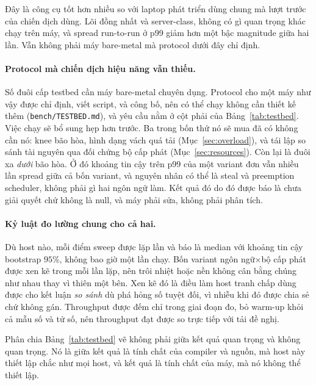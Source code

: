 Đây là công cụ tốt hơn nhiều so với laptop phát triển dùng chung mà lượt trước của
chiến dịch dùng. Lõi đồng nhất và server-class, không có gì quan trọng khác
chạy trên máy, và spread run-to-run ở p99 giảm hơn một bậc
magnitude giữa hai lần. Vẫn không phải máy bare-metal mà protocol dưới đây chỉ định.

\paragraph{Protocol mà chiến dịch hiệu năng vẫn thiếu.}
Số đuôi cấp testbed cần máy bare-metal chuyên dụng. Protocol cho một máy như vậy
được chỉ định, viết script, và công bố, nên có thể chạy không cần thiết kế thêm
(\texttt{bench/TESTBED.md}), và yêu cầu nằm ở cột phải của
Bảng~\ref{tab:testbed}. Việc chạy sẽ bổ sung hẹp hơn trước. Ba trong bốn
thứ nó sẽ mua đã có không cần nó: knee bão hòa, hình dạng
vách quá tải
(Mục~\ref{sec:overload}), và tái lập so sánh tài nguyên qua đối chứng bộ cấp phát
(Mục~\ref{sec:resources}). Còn lại là đuôi xa \emph{dưới} bão hòa.
Ở đó khoảng tin cậy trên p99 của một variant đơn vẫn nhiều lần spread giữa
cả bốn variant, và nguyên nhân có thể là steal và preemption scheduler, không
phải gì hai ngôn ngữ làm. Kết quả đó do đó được báo là chưa giải quyết chứ không
là null, và máy phải sửa, không phải phân tích.

\paragraph{Kỷ luật đo lường chung cho cả hai.}
Dù host nào, mỗi điểm sweep được lặp \NRepeats{} lần và báo là
median với khoảng tin cậy bootstrap $95\%$, không bao giờ một lần chạy. Bốn
variant ngôn ngữ$\times$bộ cấp phát được xen kẽ trong mỗi lần lặp, nên trôi nhiệt hoặc
nền không cân bằng chúng như nhau thay vì thiên một bên. Xen kẽ đó là điều làm
host tranh chấp dùng được cho kết luận \emph{so sánh} dù phá hỏng
số tuyệt đối, vì nhiễu khi đó được chia sẻ chứ không gán. Throughput được đếm
chỉ trong giai đoạn đo, bỏ warm-up khỏi cả mẫu số và
tử số, nên throughput đạt được so trực tiếp với tải đề nghị.

Phân chia Bảng~\ref{tab:testbed} vẽ không phải giữa kết quả quan trọng và không quan trọng. Nó
là giữa kết quả là tính chất của compiler và nguồn, mà host này thiết lập
chắc như mọi host, và kết quả là tính chất của máy, mà nó không thể
thiết lập.

